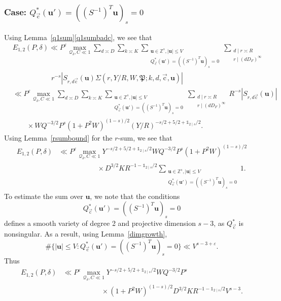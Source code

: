 \documentclass[letterpaper,11pt]{amsart}
\numberwithin{equation}{section}
\theoremstyle{definition}
\numberwithin{equation}{section}
\newcommand{\ZZ}{\mathbb{Z}}
\newcommand{\uu}{\mathbf{u}}
\newcommand{\uc}{{\vec{\mathrm{c}}}}
\newcommand{\ve}{\varepsilon}
\begin{document}
\subsubsection{Case: $Q_\uc^*(\uu')=((S^{-1})^T\uu)_s=0 $}
\label{sec:bad-c-Q-S-zero}
Using Lemma~\ref{q1sum}\eqref{q1sumbadc}, we see that  
\begin{align*}
& E_{1,2}(P,\delta)\ll P^{\ve} \max_{ \mathcal Q_\delta, C\ll 1}\sum_{d\asymp D}\sum_{k\asymp K}\sum_{\substack{\uu\in\ZZ^s,  |\uu|\leq V\\ Q_\uc^*(\uu')=((S^{-1})^T\uu)_s=0  }}\sum_{\substack{d\mid r\asymp R\\  r\mid (dD_F)^\infty}}\\ & \quad \quad \quad \quad  \quad \ \ r^{-s}|S_{r, d\uc}(\uu) \Sigma(r, Y/R, W, \mathfrak P;k,d, \uc, \uu)|\\
&\ll P^{\ve} \max_{\mathcal Q_\delta, C\ll 1} \sum_{d\asymp D}\sum_{k\asymp K}\sum_{\substack{\uu\in\ZZ^s,  |\uu|\leq V\\ Q_\uc^*(\uu')=((S^{-1})^T\uu)_s=0}}\sum_{\substack{d\mid r\asymp R\\ r\mid (dD_F)^\infty}}R^{-s}|S_{r, d\uc}(\uu)|\\ 
&\quad\quad \times WQ^{-3/2} P^{s} (1+P^2W)^{(1-s)/2} (Y/R)^{-s/2+5/2+\mathds 1_{2\mid s}/2}.
\end{align*}
Using Lemma~\ref{rsumbound} for the $r$-sum, we see that 
\begin{align*}
E_{1,2}(P, \delta)&\ll P^{\ve} \max_{\mathcal Q_\delta, C\ll 1} Y^{-s/2+5/2+\mathds 1_{2\mid s}/2}WQ^{-3/2}P^{s}(1+P^2W)^{(1-s)/2}\\ & \quad \quad \quad \quad \quad \ \ \times D^{3/2}K R^{-1-\mathds 1_{2\mid s}/2}\sum_{\substack{\uu\in\ZZ^s, |\uu|\leq V\\ Q_\uc^*(\uu')=((S^{-1})^T\uu)_s=0}}1.
\end{align*}
To estimate the sum over $\uu$, we note that the conditions $$Q_\uc^*(\uu')=((S^{-1})^T\uu)_s=0  $$ defines a smooth variety of degree 2 and projective dimension $s-3$, as $Q_\uc^*$ is nonsingular. As a result, using Lemma~\ref{dimgrowth},
\begin{equation*}
\#\{ |\uu|\leq V:Q_\uc^*(\uu')=((S^{-1})^T\uu)_s=0\} \ll V^{s-3+\ve}.
\end{equation*}
Thus 
\begin{align*}
E_{1,2}(P, \delta)&\ll P^{\ve}\max_{\mathcal Q_\delta, C\ll 1}Y^{-s/2+5/2+\mathds 1_{2\mid s}/2}WQ^{-3/2} P^{s} \\ & \quad \quad \quad \quad \quad \ \ \times (1+P^2 W)^{(1-s)/2} D^{3/2}K R^{-1-\mathds 1_{2\mid s}/2} V^{s-3}.
\end{align*}
\end{document}
